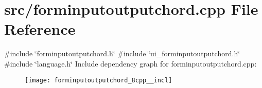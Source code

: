 \section{src/forminputoutputchord.cpp File Reference}
\label{forminputoutputchord_8cpp}
{\ttfamily \#include \char`\"{}forminputoutputchord.\+h\char`\"{}}\newline
{\ttfamily \#include \char`\"{}ui\+\_\+forminputoutputchord.\+h\char`\"{}}\newline
{\ttfamily \#include \char`\"{}language.\+h\char`\"{}}\newline
Include dependency graph for forminputoutputchord.\+cpp\+:\nopagebreak
\begin{figure}[H]
\begin{center}
\leavevmode
\texttt{[image: forminputoutputchord\_8cpp\_\_incl]}
\end{center}
\end{figure}
